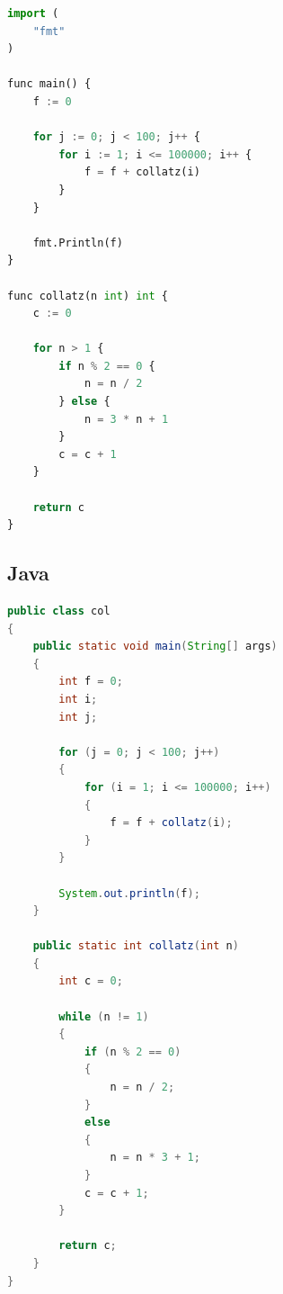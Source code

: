 \documentclass[12pt,swedish]{article}
\begin{document}
\begin{appendices}
\begin{lstlisting}[language=Python]
import (
    "fmt"
)

func main() {
    f := 0

    for j := 0; j < 100; j++ {
        for i := 1; i <= 100000; i++ {
            f = f + collatz(i)
        }
    }

    fmt.Println(f)
}

func collatz(n int) int {
    c := 0

    for n > 1 {
        if n % 2 == 0 {
            n = n / 2
        } else {
            n = 3 * n + 1
        }
        c = c + 1
    }

    return c
}
\end{lstlisting}


\newpage
\subsection{Java}
\begin{lstlisting}[language=java]
public class col
{
    public static void main(String[] args)
    {
        int f = 0;
        int i;
        int j;

        for (j = 0; j < 100; j++)
        {
            for (i = 1; i <= 100000; i++)
            {
                f = f + collatz(i);
            }
        }

        System.out.println(f);
    }

    public static int collatz(int n)
    {
        int c = 0;

        while (n != 1)
        {
            if (n % 2 == 0)
            {
                n = n / 2;
            }
            else
            {
                n = n * 3 + 1;
            }
            c = c + 1;
        }

        return c;
    }
}
\end{lstlisting}

\end{appendices}

\end{document}
